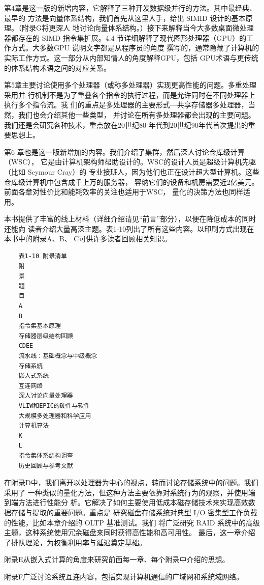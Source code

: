 第4章是这一版的新增内容，它解释了三种开发数据级并行的方法。其中最经典、最早的
方法是向量体系结构，我们首先从这里人手，给出 SIMID 设计的基本原理。（附录G将更深人
地讨论向量体系结构。）接下来解释当今大多数桌面微处理器都存在的 SIMD 指令集扩展。4.4
节详细解释了现代图形处理器（GPU）的工作方式。大多数GPU 说明文字都是从程序员的角度
撰写的，通常隐藏了计算机的实际工作方式。这一部分从内部知情人的角度解释GPU，包括
GPU术语与更传统的体系结构术语之间的对应关系。

第5章主要讨论使用多个处理器（或称多处理器）实现更高性能的问题。多重处理采用并
行机制不是为了重叠各个指令的执行过程，而是允许同时在不同处理器上执行多个指令流。我
们的重点是多处理器的主要形式—共享存储器多处理器，当然，我们也会介绍其他一些类型，
并讨论在所有多处理器都会出现的主要问题。我们还是会研究各种技术，重点放在20世纪80
年代到20世纪90年代首次提出的重要思想上。

第6 章也是这一版新增加的内容。我们介绍了集群，然后深人讨论仓库级计算（WSC），
它是由计算机架构师帮助设计的。WSC的设计人员是超级计算机先驱（比如 Seymour Cray）的
专业接班人，因为他们也正在设计超大型计算机。这些仓库级计算机中包含成千上万的服务器，
容纳它们的设备和机房需要近2亿美元。前面各章对性价比和能耗效率的关注也适用于WSC，
量化的決策方法也同样适用。

本书提供了丰富的线上材料（详细介绍请见“前言”部分），以便在降低成本的同时还能向
读者介绍大量高深主题。表1-10列出了所有这些内容。以印刷方式出现在本书中的附录A、B、
C可供许多读者回顾相关知识。

\begin{verbatim}
    表1-10 附录清单
    附
    景
    题
    目
    A
    B
    指令集基本原理
    存储器层级结构回顾
    CDEE
    流水线：基础概念与中级概念
    存储系統
    嵌人式系统
    互连网络
    深人讨论向量处理器
    VLIW和EPIC的硬件与软件
    大规模多处理器和科学应用
    计算机算法
    K
    L
    指令集体系结构调查
    历史回顾与参考文献
\end{verbatim}
在附录D中，我们离开以处理器为中心的视点，转而讨论存储系统中的问题。我们采用了
一种类似的量化方法，但这种方法主要依靠对系统行为的观察，并使用端到端方法进行性能分
析。它解决了如何主要使用低成本磁存储技术来实现高效数据存储与提取的重要问题。重点是
研究磁盘存储系统对典型 I/O 密集型工作负载的性能，比如本章介绍的 OLTP 基准测试。我们
将广泛研究 RAID 系统中的高级主题，这种系统使用冗余磁盘来同时获得高性能和高可用性。
最后，这一章介绍了排队理论，为权衡利用率与延迟奠定基础。

附录E从嵌入式计算的角度来研究前面每一章、每个附录中介绍的思想。

附录F广泛讨论系统互连内容，包括实现计算机通信的广域网和系统域网络。

